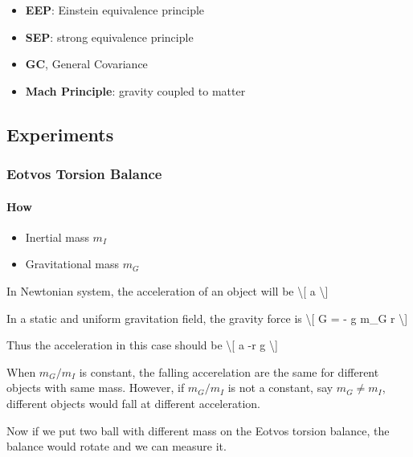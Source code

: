 \documentclass[letterpaper,10pt,english]{sphinxmanual}
\begin{document}
{\begin{itemize}
\item {} 
\textbf{EEP}: Einstein equivalence principle

\item {} 
\textbf{SEP}: strong equivalence principle

\item {} 
\textbf{GC}, General Covariance

\item {} 
\textbf{Mach Principle}: gravity coupled to matter

\end{itemize}


\subsection{Experiments}
\label{GeneralRelativityAdv:experiments}

\subsubsection{Eotvos Torsion Balance}
\label{GeneralRelativityAdv:eotvos-torsion-balance}

\paragraph{How}
\label{GeneralRelativityAdv:how}\begin{itemize}
\item {} 
Inertial mass $m_I$

\item {} 
Gravitational mass $m_G$

\end{itemize}

In Newtonian system, the acceleration of an object will be \textbackslash{}{[} a \textbackslash{}{]}

In a static and uniform gravitation field, the gravity force is \textbackslash{}{[} G =
- g m\_G r \textbackslash{}{]}

Thus the acceleration in this case should be \textbackslash{}{[} a -r g \textbackslash{}{]}

When $m_G/m_I$ is constant, the falling accerelation are the same
for different objects with same mass. However, if $m_G/m_I$ is not
a constant, say $m_G\ne m_I$, different objects would fall at
different acceleration.

Now if we put two ball with different mass on the Eotvos torsion
balance, the balance would rotate and we can measure it.


}
\end{document}
